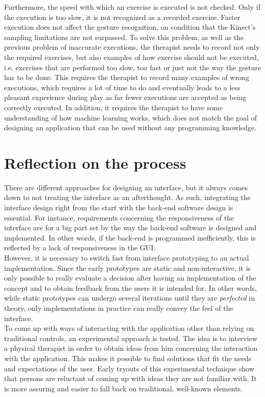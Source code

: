 Furthermore, the speed with which an exercise is executed is not checked. Only if the execution is too slow, it is not recognized as a recorded exercise. Faster execution does not affect the gesture recognition, on condition that the Kinect's sampling limitations are not surpassed. To solve this problem, as well as the previous problem of inaccurate executions, the therapist needs to record not only the required exercises, but also examples of how exercise should not be executed, i.e. exercises that are performed too slow, too fast or just not the way the gesture has to be done. This requires the therapist to record many examples of wrong executions, which requires a lot of time to do and eventually leads to a less pleasant experience during play as far fewer executions are accepted as being correctly executed. In addition, it requires the therapist to have some understanding of how machine learning works, which does not match the goal of designing an application that can be used without any programming knowledge.

\section{Reflection on the process}

There are different approaches for designing an interface, but it always comes down to not treating the interface as an afterthought. As such, integrating the interface design right from the start with the back-end software design is essential. For instance, requirements concerning the responsiveness of the interface are for a big part set by the way the back-end software is designed and implemented. In other words, if the back-end is programmed inefficiently, this is reflected by a lack of responsiveness in the GUI.\\

However, it is necessary to switch fast from interface prototyping to an actual implementation. Since the early prototypes are static and non-interactive, it is only possible to really evaluate a decision after having an implementation of the concept and to obtain feedback from the users it is intended for. In other words, while static prototypes can undergo several iterations until they are \emph{perfected} in theory, only implementations in practice can really convey the feel of the interface.\\

To come up with ways of interacting with the application other than relying on traditional controls, an experimental approach is tested. The idea is to interview a physical therapist in order to obtain ideas from him concerning the interaction with the application. This makes it possible to find solutions that fit the needs and expectations of the user. Early tryouts of this experimental technique show that persons are reluctant of coming up with ideas they are not familiar with. It is more assuring and easier to fall back on traditional, well-known elements.\\

